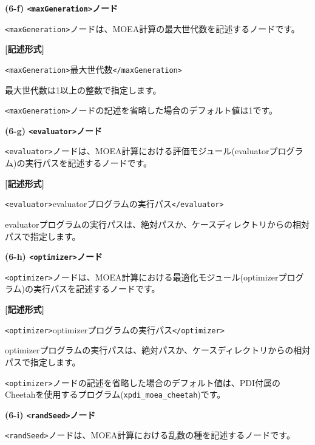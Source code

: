 \documentclass[a4paper,11pt]{jarticle}
\begin{document}
{\vspace{12pt}
\textbf{(6-f) \texttt{<maxGeneration>}ノード}

\texttt{<maxGeneration>}ノードは、MOEA計算の最大世代数を記述するノードです。

\vspace{8pt}
\leftskip=12pt
\textbf{[記述形式]}

\leftskip=42pt
\texttt{<maxGeneration>}最大世代数\texttt{</maxGeneration>}

\vspace{8pt}
\leftskip=0pt
最大世代数は1以上の整数で指定します。

\texttt{<maxGeneration>}ノードの記述を省略した場合のデフォルト値は1です。


\vspace{12pt}
\textbf{(6-g) \texttt{<evaluator>}ノード}

\texttt{<evaluator>}ノードは、MOEA計算における評価モジュール(evaluatorプログラム)の実行パスを記述するノードです。

\vspace{8pt}
\leftskip=12pt
\textbf{[記述形式]}

\leftskip=42pt
\texttt{<evaluator>}evaluatorプログラムの実行パス\texttt{</evaluator>}

\vspace{8pt}
\leftskip=0pt
evaluatorプログラムの実行パスは、絶対パスか、ケースディレクトリからの相対パスで指定します。

\vspace{12pt}
\textbf{(6-h) \texttt{<optimizer>}ノード}

\texttt{<optimizer>}ノードは、MOEA計算における最適化モジュール(optimizerプログラム)の実行パスを記述するノードです。

\vspace{8pt}
\leftskip=12pt
\textbf{[記述形式]}

\leftskip=42pt
\texttt{<optimizer>}optimizerプログラムの実行パス\texttt{</optimizer>}

\vspace{8pt}
\leftskip=0pt
optimizerプログラムの実行パスは、絶対パスか、ケースディレクトリからの相対パスで指定します。

\texttt{<optimizer>}ノードの記述を省略した場合のデフォルト値は、PDI付属のCheetahを使用するプログラム({\tt xpdi\_moea\_cheetah})です。

\vspace{12pt}
\textbf{(6-i) \texttt{<randSeed>}ノード}

\texttt{<randSeed>}ノードは、MOEA計算における乱数の種を記述するノードです。

}
\end{document}

